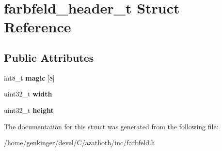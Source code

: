 \hypertarget{structfarbfeld__header__t}{}\section{farbfeld\+\_\+header\+\_\+t Struct Reference}
\label{structfarbfeld__header__t}
\subsection*{Public Attributes}
\begin{DoxyCompactItemize}
\item 
\mbox{\label{structfarbfeld__header__t_a018fd4f1bb40613738d2563ab9a27b4a}} 
int8\+\_\+t {\bfseries magic} \mbox{[}8\mbox{]}
\item 
\mbox{\label{structfarbfeld__header__t_a285e1dd203b567d6459e7d2fbcedca44}} 
uint32\+\_\+t {\bfseries width}
\item 
\mbox{\label{structfarbfeld__header__t_ab90e2799d4d3d943d3c7ddb8dca12534}} 
uint32\+\_\+t {\bfseries height}
\end{DoxyCompactItemize}


The documentation for this struct was generated from the following file\+:\begin{DoxyCompactItemize}
\item 
/home/genkinger/devel/\+C/azathoth/inc/farbfeld.\+h\end{DoxyCompactItemize}
